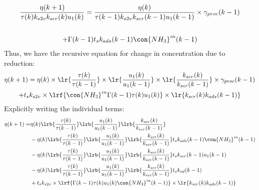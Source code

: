 \begin{multline*}
        \frac{\eta(k+1)}{\tau(k) k_{s2v} k_{scr}(k) u_1(k)}
        = \frac{\eta(k)}{\tau(k-1) k_{s2v} k_{scr}(k-1) u_1(k-1)} \times \gamma_{proc}(k-1)\\
                        \\ + \Gamma(k-1) t_s k_{ads}(k-1) \con{NH_3}^{in}(k-1)
\end{multline*}
Thus, we have the recursive equation for change in concentration due to reduction:
\begin{multline}
        \eta(k+1) = \eta(k) \times \lr{\frac{\tau(k)}{\tau(k-1)}}
                                \times \lr{\frac{u_1(k)}{u_1(k-1)}}
                                \times \lr{\frac{k_{scr}(k)}{k_{scr}(k-1)}}
                                \times \gamma_{proc}(k-1)
                                \\
                        + t_s k_{s2v} \times \lrf{\con{NH_3}^{in} \Gamma(k-1) \tau(k) u_1(k)} \times \lr{k_{scr}(k) k_{ads}(k-1)}
\end{multline}
Explicitly writing the individual terms:
\begin{align*}
        \eta(k+1) =& \eta(k) \lrb{\frac{\tau(k)}{\tau(k-1)}}
                                \lrb{\frac{u_1(k)}{u_1(k-1)}}
                                \lrb{\frac{k_{scr}(k)}{k_{scr}(k-1)}} \\
                &-\eta(k) \lrb{\frac{\tau(k)}{\tau(k-1)}}
                                \lrb{\frac{u_1(k)}{u_1(k-1)}}
                                \lrb{\frac{k_{scr}(k)}{k_{scr}(k-1)}}
                t_s k_{ads}(k-1) \con{NH_3}^{in}(k-1)
                \\
                &-\eta(k) \lrb{\frac{\tau(k)}{\tau(k-1)}}
                                \lrb{\frac{u_1(k)}{u_1(k-1)}}
                                \lrb{\frac{k_{scr}(k)}{k_{scr}(k-1)}}
                t_s k_{scr}(k-1) u_1(k-1)
                \\
                &-\eta(k) \lrb{\frac{\tau(k)}{\tau(k-1)}}
                                \lrb{\frac{u_1(k)}{u_1(k-1)}}
                                \lrb{\frac{k_{scr}(k)}{k_{scr}(k-1)}}
                t_s k_{od}(k-1)
                \\
                &+ t_s k_{s2v} \times \lrf{\Gamma(k-1) \tau(k) u_1(k) \con{NH_3}^{in}(k-1)} \times \lr{k_{scr}(k) k_{ads}(k-1)}
\end{align*}
\begin{equation}
       \label{eqn::nox_reduction_govern}
\end{equation}
